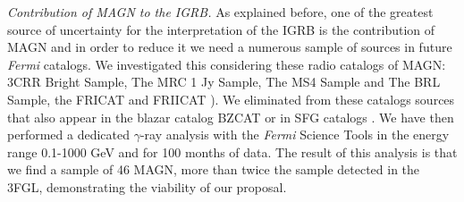 \documentclass[12 pt]{article}
\begin{document}
{\it Contribution of MAGN to the IGRB.}
As explained before, one of the greatest source of uncertainty for the interpretation of the IGRB is the contribution of MAGN and in order to reduce it we need a numerous sample of sources in future {\it Fermi} catalogs.
We investigated this considering these radio catalogs of MAGN: 3CRR Bright Sample, The MRC 1 Jy Sample, The MS4 Sample and The BRL Sample, the FRICAT \cite{Capetti:2016srb} and FRIICAT \cite{Capetti:2017fjb}).
We eliminated from these catalogs sources that also appear in the blazar catalog BZCAT \cite{Massaro:2015nia} or in SFG catalogs \cite{Sanders:2003ms,2004ApJ...606..271G}. 
We have then performed a dedicated $\gamma$-ray analysis with the {\it Fermi} Science Tools in the energy range 0.1-1000 GeV and for 100 months of data. 
The result of this analysis is that we find a sample of 46 MAGN, more than twice the sample detected in the 3FGL, demonstrating the viability of our proposal.


\end{document}
